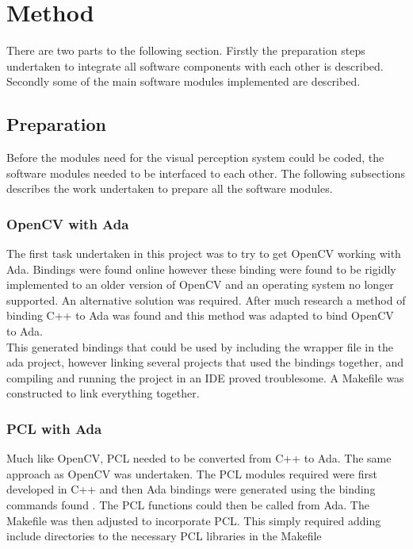 \section{Method}\label{sec:method}
There are two parts to the following section. Firstly the preparation steps undertaken to integrate all software components with each other is described. Secondly some of the main software modules implemented are described.
\subsection{Preparation}
Before the modules need for the visual perception system could be coded, the software modules needed to be interfaced to each other. The following subsections describes the work undertaken to prepare all the software modules.
\subsubsection{OpenCV with Ada}
The first task undertaken in this project was to try to get OpenCV working with Ada. Bindings were found online \cite{web:oldAdaBindings} however these binding were found to be rigidly implemented to an older version of OpenCV and an operating system no longer supported. An alternative solution was required. After much research a method of binding C++ to Ada was found \cite{web:newAdaBindings} and this method was adapted to bind OpenCV to Ada.
\\This generated bindings that could be used by including the wrapper file in the ada project, however linking several projects that used the bindings together, and compiling and running the project in an IDE proved troublesome. A Makefile was constructed to link everything together.

\subsubsection{PCL with Ada}
Much like OpenCV, PCL needed to be converted from C++ to Ada. The same approach as OpenCV was undertaken. The PCL modules required were first developed in C++ and then Ada bindings were generated using the binding commands found \cite{web:newAdaBindings}. The PCL functions could then be called from Ada. The Makefile was then adjusted to incorporate PCL. This simply required adding include directories to the necessary PCL libraries in the Makefile 

